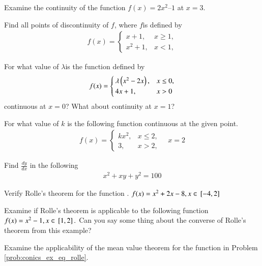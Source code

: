 %
\item Examine the continuity of the function $f(x) = 2x^2– 1$ at $x = 3$.
\item Find all points of discontinuity of $f$, where $f$is defined by
\begin{align}
f(x)=
\begin{cases}
x+1, & x \ge 1,
\\
x^2+1, & x < 1,
\end{cases}
\end{align}
%
\item For what value of $\lambda $is the function defined by 	
%
\begin{align}
f(x)=
\begin{cases}
\lambda\left(x^2-2x\right), & x \le 0,
\\
4x+1, & x > 0
\end{cases}
\end{align}
%
continuous at $x = 0$? What about continuity at $x = 1$?\item For what value of $k$ is the following function 
%
continuous at the given point.
\begin{align}
f(x)=
\begin{cases}
kx^2, & x \le 2,
\\
3, & x > 2,
\end{cases}
\quad x =2
\end{align}
%
\item Find $\frac{dy}{dx}$ in the following
\begin{align}
x^2 +xy + y^2 = 100
\end{align}
%
\item Verify Rolle's theorem for the function 
\label{prob:conics_ex_eq_rolle}.
$
f(x) = x^2+2x-8, x \in {}\left[-4,2\right]
$
\item Examine if Rolle's theorem is applicable to the following function
$
f(x) = x^2-1, x \in {}\left[1,2\right].
$
Can you say some thing about the converse of Rolle's theorem from this example?
\item  Examine the applicability of the mean value theorem for the  function in Problem \ref{prob:conics_ex_eq_rolle}.
